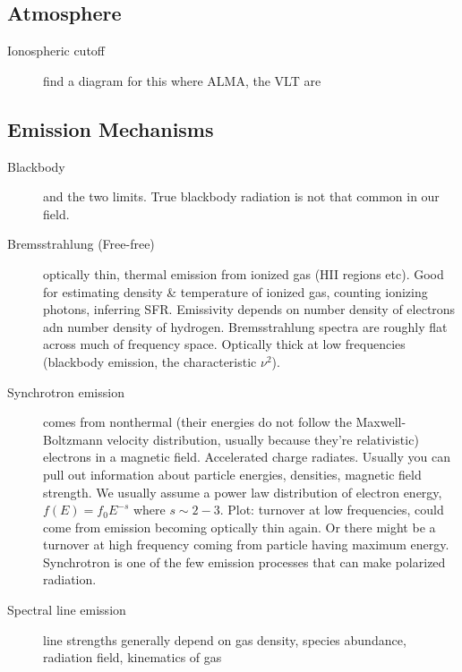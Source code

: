 \documentclass[a4paper]{article}
\begin{document}
\subsection{Atmosphere}

\begin{description}

\item[Ionospheric cutoff] find a diagram for this
where ALMA, the VLT  are

\end{description}

\subsection{Emission Mechanisms}

\begin{description}

\item[Blackbody] and the two limits. True blackbody radiation is not that common in our field.

\item[Bremsstrahlung (Free-free)] optically thin, thermal emission from ionized gas (HII regions etc). Good for estimating density \& temperature of ionized gas, counting ionizing photons, inferring SFR. Emissivity depends on number density of electrons adn number density of hydrogen. Bremsstrahlung spectra are roughly flat across much of frequency space. Optically thick at low frequencies (blackbody emission, the characteristic $\nu^2$). 

\item[Synchrotron emission] comes from nonthermal (their energies do not follow the Maxwell-Boltzmann velocity distribution, usually because they're relativistic) electrons in a magnetic field. Accelerated charge radiates. Usually you can pull out information about particle energies, densities, magnetic field strength. We usually assume a power law distribution of electron energy, $ f(E) = f_0 E^{-s} $ where $s \sim 2-3$. Plot: turnover at low frequencies, could come from emission becoming optically thin again. Or there might be a turnover at high frequency coming from particle having maximum energy. Synchrotron is one of the few emission processes that can make polarized radiation. 

\item[Spectral line emission] line strengths generally depend on gas density, species abundance, radiation field, kinematics of gas

\end{description}
\end{document}
